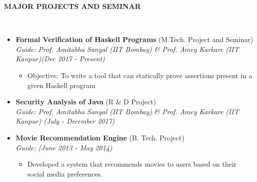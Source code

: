 \documentclass[a4paper,10pt]{article}
\newcommand{\lsep}{-0.5cm}
\newcommand{\resheading}[1]{{\small \colorbox{mygrey}{\begin{minipage}{0.975\textwidth}{\textbf{#1 \vphantom{p\^{E}}}}\end{minipage} \hspace{0.2cm}}}}
\begin{document}
\resheading{\textbf{MAJOR PROJECTS AND SEMINAR} }\\[\lsep]
\begin{itemize}[leftmargin=1.25cm]

\item \textbf{Formal Verification of Haskell Programs} (M.Tech. Project and Seminar) \\
 \emph{Guide: Prof. Amitabha Sanyal (IIT Bombay) \& Prof. Amey Karkare  (IIT Kanpur)\hfill (Dec 2017 - Present)} \\[-0.6cm]
	\begin{itemize}
	\item Objective: To write a tool that can statically prove assertions present in a given Haskell program
	\end{itemize}

\item \textbf{Security Analysis of Java } (R \& D Project) \\
 \emph{Guide: Prof. Amitabha Sanyal (IIT Bombay) \& Prof. Amey Karkare  (IIT Kanpur) \hfill (July - December 2017)}

\item \textbf{Movie Recommendation Engine 
} (B. Tech. Project) \\
 \emph{Guide:  \hfill (June 2013 - May 2014)} \\[-0.6cm]
 	\begin{itemize}
	\item Developed a system that recommends movies to users based on their social media preferences. \\[-0.4cm]
	\end{itemize}

\end{itemize}
\end{document}
